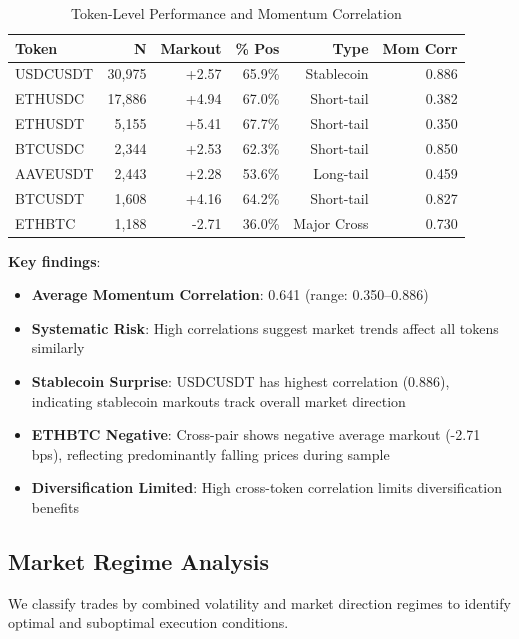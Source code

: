 \documentclass[12pt,a4paper]{article}
\begin{document}
\begin{table}[H]
\centering
\caption{Token-Level Performance and Momentum Correlation}
\label{tab:cross_token}
\begin{tabular}{lrrrrr}
\toprule
\textbf{Token} & \textbf{N} & \textbf{Markout} & \textbf{\% Pos} & \textbf{Type} & \textbf{Mom Corr} \\
\midrule
USDCUSDT & 30,975 & +2.57 & 65.9\% & Stablecoin & 0.886 \\
ETHUSDC & 17,886 & +4.94 & 67.0\% & Short-tail & 0.382 \\
ETHUSDT & 5,155 & +5.41 & 67.7\% & Short-tail & 0.350 \\
BTCUSDC & 2,344 & +2.53 & 62.3\% & Short-tail & 0.850 \\
AAVEUSDT & 2,443 & +2.28 & 53.6\% & Long-tail & 0.459 \\
BTCUSDT & 1,608 & +4.16 & 64.2\% & Short-tail & 0.827 \\
ETHBTC & 1,188 & -2.71 & 36.0\% & Major Cross & 0.730 \\
\bottomrule
\end{tabular}
\end{table}

\textbf{Key findings}:
\begin{itemize}
    \item \textbf{Average Momentum Correlation}: 0.641 (range: 0.350--0.886)
    \item \textbf{Systematic Risk}: High correlations suggest market trends affect all tokens similarly
    \item \textbf{Stablecoin Surprise}: USDCUSDT has highest correlation (0.886), indicating stablecoin markouts track overall market direction
    \item \textbf{ETHBTC Negative}: Cross-pair shows negative average markout (-2.71 bps), reflecting predominantly falling prices during sample
    \item \textbf{Diversification Limited}: High cross-token correlation limits diversification benefits
\end{itemize}

\subsection{Market Regime Analysis}

We classify trades by combined volatility and market direction regimes to identify optimal and suboptimal execution conditions.
\end{document}

